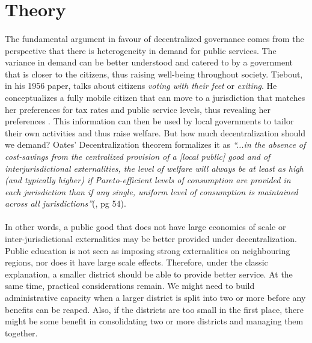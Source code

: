 \documentclass[12pt, a4paper]{article}
\begin{document}
\section*{Theory}
\paragraph{} The fundamental argument in favour of decentralized governance comes from the perspective that there is heterogeneity in demand for public services. The variance in demand can be better understood and catered to by a government that is closer to the citizens, thus raising well-being throughout society. Tiebout, in his 1956 paper, talks about citizens \textit{voting with their feet} or \textit{exiting}. He conceptualizes a fully mobile citizen that can move to a jurisdiction that matches her preferences for tax rates and public service levels, thus revealing her preferences \parencite{tiebout_economies_1960}. This information can then be used by local governments to tailor their own activities and thus raise welfare. But how much decentralization should we demand? Oates' Decentralization theorem formalizes it as \textit{``...in the absence of cost-savings from the centralized provision of a [local public] good and of interjurisdictional externalities, the level of welfare will always be at least as high (and typically higher) if Pareto-efficient levels of consumption are provided in each jurisdiction than if any single, uniform level of consumption is maintained across all jurisdictions''}(\cite{oates_fiscal_1972}, pg 54). \nocite{oates1999essay}

\paragraph{} In other words, a public good that does not have large economies of scale or inter-jurisdictional externalities may be better provided under decentralization. Public education is not seen as imposing strong externalities on neighbouring regions, nor does it have large scale effects. Therefore, under the classic explanation, a smaller district should be able to provide better service. At the same time, practical considerations remain. We might need to build administrative capacity when a larger district is split into two or more before any benefits can be reaped. Also, if the districts are too small in the first place, there might be some benefit in consolidating two or more districts and managing them together.  
\end{document}
